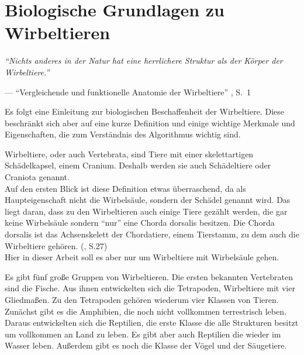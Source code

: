 \chapter{Biologische Grundlagen zu Wirbeltieren}
\label{chapter:biology}

\begin{center}
 \begin{minipage}{12cm}
  \emph{"`Nichts anderes in der Natur hat eine herrlichere Struktur als der Körper der Wirbeltiere."'}
 
  --- "`Vergleichende und funktionelle Anatomie der Wirbeltiere"' \cite{Vergleichende_Anatomie}, S.\ 1
 \end{minipage}
\end{center}

Es folgt eine Einleitung zur biologischen Beschaffenheit der Wirbeltiere. Diese beschränkt sich aber auf eine kurze Definition und einige wichtige Merkmale und Eigenschaften, die zum Verständnis des Algorithmus wichtig sind.

Wirbeltiere, oder auch Vertebrata, sind Tiere mit einer skelettartigen Schädelkapsel, einem Cranium. Deshalb werden sie auch Schädeltiere oder Craniota genannt.\\
Auf den ersten Blick ist diese Definition etwas überraschend, da als  Haupteigenschaft nicht die Wirbelsäule, sondern der Schädel genannt wird. Das liegt daran, dass zu den Wirbeltieren auch einige Tiere gezählt werden, die gar keine Wirbelsäule sondern "`nur"' eine Chorda dorsalis besitzen. Die Chorda dorsalis ist das Achsenskelett der Chordatiere, einem Tierstamm, zu dem auch die Wirbeltiere gehören. (\cite{Vergleichende_Anatomie}, S.27)\\ %
Hier in dieser Arbeit soll es aber nur um Wirbeltiere mit Wirbelsäule gehen.

Es gibt fünf große Gruppen von Wirbeltieren. Die ersten bekannten Vertebraten sind die Fische. Aus ihnen entwickelten sich die Tetrapoden, Wirbeltiere mit vier Gliedmaßen. Zu den Tetrapoden gehören wiederum vier Klassen von Tieren. Zunächst gibt es die Amphibien, die noch nicht vollkommen terrestrisch leben. Daraus entwickelten sich die Reptilien, die erste Klasse die alle Strukturen besitzt um vollkommen an Land zu leben. Es gibt aber auch Reptilien die wieder im Wasser leben. Außerdem gibt es noch die Klasse der Vögel und der Säugetiere.

